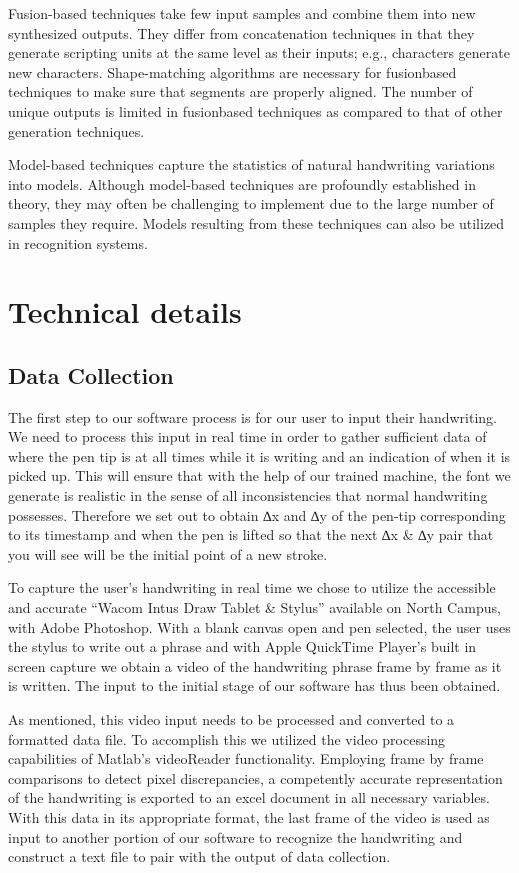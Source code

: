 \documentclass{article} %
\begin{document}
Fusion-based techniques take few input samples and combine
them into new synthesized outputs. They differ from concatenation
techniques in that they generate scripting units at the
same level as their inputs; e.g., characters generate new characters.
Shape-matching algorithms are necessary for fusionbased
techniques to make sure that segments are properly
aligned. The number of unique outputs is limited in fusionbased
techniques as compared to that of other generation
techniques.

Model-based techniques capture the statistics of natural
handwriting variations into models. Although model-based
techniques are profoundly established in theory, they may
often be challenging to implement due to the large number
of samples they require. Models resulting from
these techniques can also be utilized in recognition systems. 

\section{Technical details}
\subsection{Data Collection}

The first step to our software process is for our user to input their handwriting. We need to process this input in real time in order to gather sufficient data of where the pen tip is at all times while it is writing and an indication of when it is picked up. This will ensure that with the help of our trained machine, the font we generate is realistic in the sense of all inconsistencies that normal handwriting possesses. Therefore we set out to obtain ∆x and ∆y of the pen-tip corresponding to its timestamp and when the pen is lifted so that the next ∆x & ∆y pair that you will see will be the initial point of a new stroke. 

To capture the user’s handwriting in real time we chose to utilize the accessible and accurate “Wacom Intus Draw Tablet & Stylus” available on North Campus, with Adobe Photoshop. With a blank canvas open and pen selected, the user uses the stylus to write out a phrase and with Apple QuickTime Player’s built in screen capture we obtain a video of the handwriting phrase frame by frame as it is written. The input to the initial stage of our software has thus been obtained. 

As mentioned, this video input needs to be processed and converted to a formatted data file. To accomplish this we utilized the video processing capabilities of Matlab’s videoReader functionality. Employing frame by frame comparisons to detect pixel discrepancies, a competently accurate representation of the handwriting is exported to an excel document in all necessary variables. With this data in its appropriate format, the last frame of the video is used as input to another portion of our software to recognize the handwriting and construct a text file to pair with the output of data collection.
\end{document}

